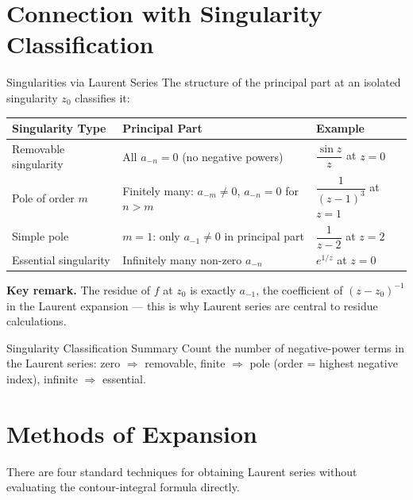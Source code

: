 \documentclass[12pt,a4paper]{article}
\begin{document}
\section{Connection with Singularity Classification}

\begin{infobox}{Singularities via Laurent Series}
The structure of the principal part at an isolated singularity $z_0$ classifies it:

\medskip
\begin{tabular}{lll}
\toprule
\textbf{Singularity Type} & \textbf{Principal Part} & \textbf{Example} \\
\midrule
Removable singularity & All $a_{-n}=0$ (no negative powers) & $\dfrac{\sin z}{z}$ at $z=0$ \\[6pt]
Pole of order $m$ & Finitely many: $a_{-m}\neq 0$, $a_{-n}=0$ for $n>m$ & $\dfrac{1}{(z-1)^3}$ at $z=1$ \\[6pt]
Simple pole & $m=1$: only $a_{-1}\neq 0$ in principal part & $\dfrac{1}{z-2}$ at $z=2$ \\[6pt]
Essential singularity & Infinitely many non-zero $a_{-n}$ & $e^{1/z}$ at $z=0$ \\
\bottomrule
\end{tabular}
\end{infobox}

\noindent\textbf{Key remark.} The residue of $f$ at $z_0$ is exactly $a_{-1}$, the
coefficient of $(z-z_0)^{-1}$ in the Laurent expansion --- this is why Laurent series are
central to residue calculations.

\begin{learnbox}{Singularity Classification Summary}
Count the number of negative-power terms in the Laurent series: zero $\Rightarrow$ removable,
finite $\Rightarrow$ pole (order = highest negative index), infinite $\Rightarrow$ essential.
\end{learnbox}

\section{Methods of Expansion}

There are four standard techniques for obtaining Laurent series without evaluating the
contour-integral formula directly.
\end{document}
